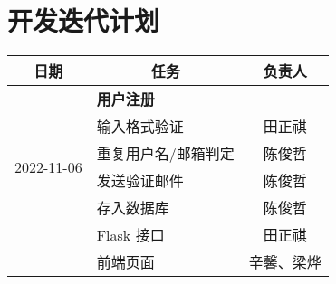 \section{开发迭代计划}

\begin{table}[h!]
    \centering
    \begin{tabular}{clc}\toprule
        \textbf{日期} & \multicolumn{1}{c}{\textbf{任务}} & \textbf{负责人} \\\midrule
        \multirow{6}{*}{2022-11-06} & \textbf{用户注册} & \\
        & 输入格式验证 & 田正祺 \\
        & 重复用户名/邮箱判定 & 陈俊哲 \\
        & 发送验证邮件 & 陈俊哲 \\
        & 存入数据库 &  陈俊哲 \\
        & Flask 接口 & 田正祺 \\
        & 前端页面 & 辛馨、梁烨 \\
        \bottomrule
    \end{tabular}
\end{table}


